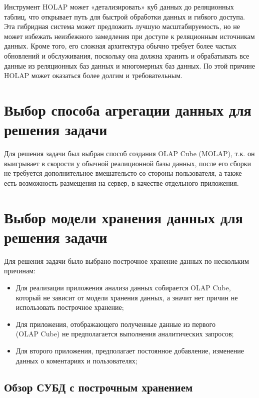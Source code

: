 Инструмент HOLAP может «детализировать» куб данных до реляционных таблиц, что открывает путь для быстрой обработки данных и гибкого доступа. 
Эта гибридная система может предложить лучшую масштабируемость, но не может избежать неизбежного замедления при доступе к реляционным источникам данных. 
Кроме того, его сложная архитектура обычно требует более частых обновлений и обслуживания,
поскольку она должна хранить и обрабатывать все данные из реляционных баз данных и многомерных баз данных. 
По этой причине HOLAP может оказаться более долгим и требовательным.


\section{Выбор способа агрегации данных для решения задачи}

Для решения задачи был выбран способ создания OLAP Cube (MOLAP),
 т.к. он выигрывает в скорости у обычной реалиционной базы данных, 
 после его сборки не требуется дополнительное вмешательсто со стороны пользователя, 
 а также есть возможность размещения на сервер, в качестве отдельного приложения.
 
 
\section{Выбор модели хранения данных для решения задачи}

Для решения задачи было выбрано построчное хранение данных по нескольким причинам:

\begin{itemize}
	\item Для реализации приложения анализа данных собирается OLAP Cube, 
	который не зависит от модели хранения данных, 
	а значит нет причин не использовать построчное хранение;
	
	\item Для приложения, отображающего полученные данные из первого \\(OLAP Cube)
	не предполагается выполнения аналитических запросов;
	
	\item Для второго приложения, предполагает постоянное добавление, изменение данных о коментариях и пользователях;
	
	
\end{itemize}

\subsection{Обзор СУБД с построчным хранением}
	
